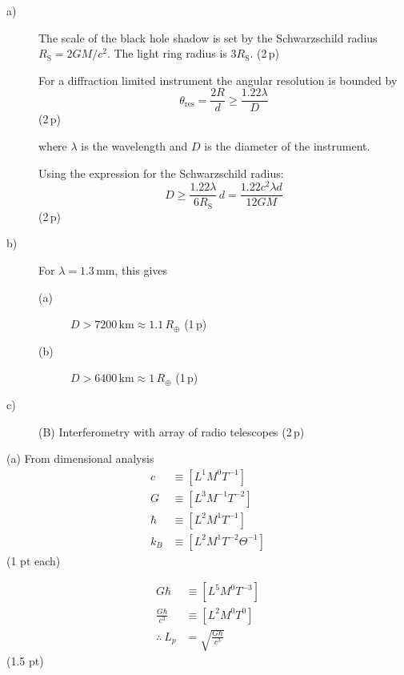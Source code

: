 \begin{description}
\item[a)] The scale of the black hole shadow is set by the Schwarzschild
  radius $R_{\mathrm{S}} = 2GM/c^2$. The light ring radius is
  $3R_{\mathrm{S}}$. \hfill(2\,p)

  For a diffraction limited instrument the angular resolution is bounded by
  \begin{equation*}
    \theta_{\mathrm{res}} = \frac{2R}{d} \ge \frac{1.22\lambda}{D}
    \tag{3.1}
  \end{equation*}
  \hfill(2\,p)

  where $\lambda$ is the wavelength and $D$ is the diameter of the
  instrument.

  Using the expression for the Schwarzschild radius:
  \begin{equation*}
    D \ge \frac{1.22\lambda}{6R_{\mathrm{S}}}\,d
      = \frac{1.22c^2\lambda d}{12GM}
    \tag{3.2}
  \end{equation*}
  \hfill(2\,p)
\item[b)] For $\lambda = 1.3$\,mm, this gives
  \begin{description}
  \item[(a)] $D > 7200\,\mathrm{km} \approx 1.1\,R_\oplus$ \hfill(1\,p)
  \item[(b)] $D > 6400\,\mathrm{km} \approx 1\,R_\oplus$ \hfill(1\,p)
  \end{description}
\item[c)] (B) Interferometry with array of radio telescopes \hfill(2\,p)
\end{description}

(a) From dimensional analysis
\begin{align*}
  c &\equiv \left[L^1 M^0 T^{-1}\right]\\
  G &\equiv \left[L^3 M^{-1} T^{-2}\right]\\
  \hbar &\equiv \left[L^2 M^1 T^{-1}\right]\\
  k_B &\equiv \left[L^2 M^1 T^{-2} \Theta^{-1}\right]
\end{align*}
\hfill(1 pt each)

\begin{align*}
  G\hbar &\equiv \left[L^5 M^0 T^{-3}\right]\\
  \frac{G\hbar}{c^3} &\equiv \left[L^2 M^0 T^0\right]\\
  \therefore\ L_p &= \sqrt{\frac{G\hbar}{c^3}}
\end{align*}
\hfill(1.5 pt)

